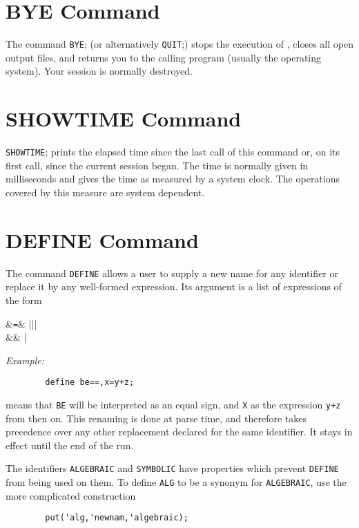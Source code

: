 \hypertarget{command:QUIT}{}
\hypertarget{command:BYE}{\section{BYE Command}}

The command \texttt{BYE}; (or alternatively \texttt{QUIT};)
stops the execution
of {\REDUCE}, closes all open output files, and returns you to the calling
program (usually the operating system).  Your {\REDUCE} session is
normally destroyed.

\section{SHOWTIME Command}
\hypertarget{command:SHOWTIME}{}

\texttt{SHOWTIME}; prints the elapsed time since the last call of this
command or, on its first call, since the current {\REDUCE} session began.
The time is normally given in milliseconds and gives the time as measured
by a system clock.  The operations covered by this measure are system
dependent.

\section{DEFINE Command}
\hypertarget{command:DEFINE}{}

The command \texttt{DEFINE} allows a user to supply a new name for
any identifier or replace it by any well-formed expression.  Its argument
is a list of expressions of the form
\begin{syntaxtable}
    &\texttt{=}& |||\\
                    &&    |
\end{syntaxtable}

\textit{Example:}
\begin{verbatim}
        define be==,x=y+z;
\end{verbatim}
means that \texttt{BE} will be interpreted as an equal sign, and \texttt{X}
as the expression \texttt{y+z} from then on.  This renaming is done at parse
time, and therefore takes precedence over any other replacement declared
for the same identifier.  It stays in effect until the end of the
{\REDUCE} run.

The identifiers \texttt{ALGEBRAIC} and \texttt{SYMBOLIC} have properties which
prevent \texttt{DEFINE} from being used on them.  To define
\texttt{ALG} to be a synonym for \texttt{ALGEBRAIC}, use the more complicated
construction
\begin{verbatim}
        put('alg,'newnam,'algebraic);
\end{verbatim}
